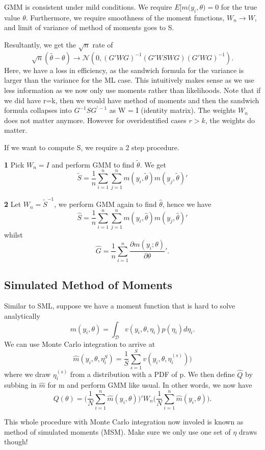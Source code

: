 \documentclass[twoside]{article}
\begin{document}
GMM is consistent under mild conditions. We require $E\big[m(y_i,\theta\big )= 0$ for the true value $\theta$. Furthermore, we require smoothness of the moment functions, $W_n \rightarrow W$, and limit of variance of method of moments goes to S.

Resultantly, we get the $\sqrt{n}$ rate of
$$
\sqrt{n}(\hat{\theta} - \theta) \rightarrow \mathcal{N}(0, (G'WG)^{-1}(G'WSWG)(G'WG)^{-1}).
$$
Here, we have a loss in efficiency, as the sandwich formula for the variance is larger than the variance for the ML case. This intuitively makes sense as we use less information as we now only use moments rather than likelihoods. Note that if we did have r=k, then we would have method of moments and then the sandwich formula collapses into $G^{-1}SG^{'-1}$ as W = I (identity matrix). The weights $W_n$ does not matter anymore. However for overidentified cases $r > k$, the weights do matter.

If we want to compute S, we require a 2 step procedure.

\textbf{1}
Pick $W_n = I$ and perform GMM to find $\tilde{\theta}$. We get
$$
\tilde{S} = \frac{1}{n}\sum_{i=1}^n\sum_{j=1}^nm(y_i,\tilde{\theta})m(y_j, \tilde{\theta})'
$$

\textbf{2}
Let $W_n = \tilde{S}^{-1}$, we perform GMM again to find $\hat{\theta}$, hence we have 
$$
\hat{S} = \frac{1}{n}\sum_{i=1}^n\sum_{j=1}^nm(y_i,\hat{\theta})m(y_j, \hat{\theta})'
$$
whilst 
$$
\hat{G} = \frac{1}{n}\sum_{i=1}^n\frac{\partial m(y_i; \theta)}{\partial \theta}'.
$$

\subsection{Simulated Method of Moments}
Similar to SML, suppose we have a moment function that is hard to solve analytically
$$
m(y_i, \theta) = \int_{\mathcal{D}}v(y_i, \theta, \eta_i)p(\eta_i)d\eta_i.
$$
We can use Monte Carlo integration to arrive at
$$
\hat{m}(y_i, \theta, \eta_i^S) = \frac{1}{S}\sum_{s=1}^Sv(y_i, \theta, \eta_i^{(s)}))
$$
where we draw $\eta_i^{(s)}$ from a distribution with a PDF of p. We then define $\hat{Q}$ by subbing in $\hat{m}$ for m and perform GMM like usual. In other words, we now have 
$$
Q(\theta) = \big(\frac{1}{N}\sum_{i=1}^n\hat{m}(y_i,\theta)\big)'W_n\big(\frac{1}{N}\sum_{i=1}^n\hat{m}(y_i,\theta)\big).
$$

This whole procedure with Monte Carlo integration now involed is known as method of simulated moments (MSM). Make sure we only use one set of $\eta$ draws though! 
\end{document}
